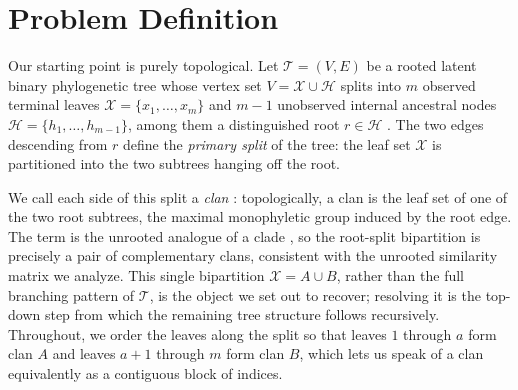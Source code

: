 %
\section{Problem Definition}\label{sec:problem}

Our starting point is purely topological. Let $\mathcal{T} = (V, E)$ be a rooted
latent binary phylogenetic tree whose vertex set $V = \mathcal{X} \cup \mathcal{H}$
splits into $m$ observed terminal leaves $\mathcal{X} = \{x_1, \dots, x_m\}$ and
$m-1$ unobserved internal ancestral nodes $\mathcal{H} = \{h_1, \dots, h_{m-1}\}$,
among them a distinguished root $r \in \mathcal{H}$ \cite{aizenbud2023spectral}.
The two edges descending from $r$ define the \emph{primary split} of the tree:
the leaf set $\mathcal{X}$ is partitioned into the two subtrees hanging off the
root.

We call each side of this split a \emph{clan}
\cite{aizenbud2023spectral, wilkinson2007clades, semple2003phylogenetics}:
topologically, a clan is the leaf set of one of the two root subtrees, the
maximal monophyletic group induced by the root edge. The term is the unrooted
analogue of a clade \cite{wilkinson2007clades}, so the root-split bipartition is
precisely a pair of complementary clans, consistent with the unrooted similarity
matrix we analyze. This single bipartition $\mathcal{X} = A \cup B$, rather than
the full branching pattern of $\mathcal{T}$, is the object we set out to recover;
resolving it is the top-down step from which the remaining tree structure follows
recursively. Throughout, we order the leaves along the split so that leaves $1$
through $a$ form clan $A$ and leaves $a+1$ through $m$ form clan $B$, which lets us
speak of a clan equivalently as a contiguous block of indices.

